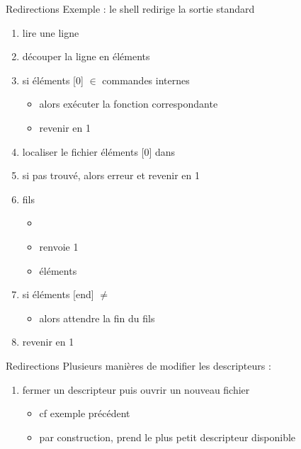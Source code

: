 \begin {frame} {Redirections}
    Exemple : le shell redirige la sortie standard
    \begin {enumerate}
	\item lire une ligne
	\item découper la ligne en éléments
	\item si éléments [0] $\in$ commandes internes
	    \begin {itemize}
		\item alors exécuter la fonction correspondante
		\item revenir en 1
	    \end {itemize}
	\item localiser le fichier éléments [0] dans 
	\item si pas trouvé, alors erreur et revenir en 1
	\item {} \implique fils
	    \begin {itemize}
		\item {}
		\item {}
		    \implique renvoie 1
		\item {} éléments \code {)}
	    \end {itemize}
	\item si éléments [end] $\neq$ \code {\&}
	    \begin {itemize}
		\item alors attendre la fin du fils
	    \end {itemize}
	\item revenir en 1
    \end {enumerate}
\end {frame}

\begin {frame} {Redirections}
    Plusieurs manières de modifier les descripteurs :

    \begin {enumerate}
	\item fermer un descripteur puis ouvrir un nouveau fichier

	    \begin {itemize}
		\item cf exemple précédent
		\item par construction,  prend le plus
		    petit descripteur disponible
	    \end {itemize}
    \end {enumerate}
\end {frame}

